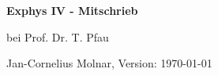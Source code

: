 \documentclass[paper=a5,fleqn,DIV=calc]{scrartcl}
\theoremstyle{graymarginwithblueheader}
\theoremstyle{graymarginwithyellowheader}
\theoremstyle{graymarginwithitblackheader}
\theoremstyle{graymarginwithblueheadern}
\theoremstyle{graymarginwithyellowheadern}
\theoremstyle{graymarginwithitblackheadern}
\begin{document}
\begin{center}
{\huge\bf Exphys IV - Mitschrieb}

bei Prof. Dr. T. Pfau

Jan-Cornelius Molnar, Version: \today\ \thistime
\end{center}

\tableofcontents

\newpage


\newpage


\newpage

\end{document}
